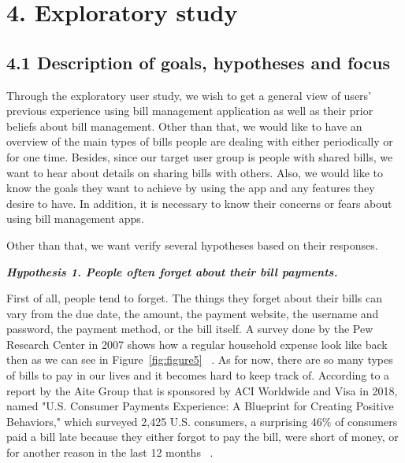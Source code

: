 \documentclass{sigchi}
\begin{document}
\section{4. Exploratory study}
\subsection{4.1 Description of goals, hypotheses and focus}

Through the exploratory user study, we wish to get a general view of users' previous experience using bill management application as well as their prior beliefs about bill management. Other than that, we would like to have an overview of the main types of bills people are dealing with either periodically or for one time. Besides, since our target user group is people with shared bills, we want to hear about details on sharing bills with others. Also, we would like to know the goals they want to achieve by using the app and any features they desire to have. In addition, it is necessary to know their concerns or fears about using bill management apps. 

Other than that, we want verify several hypotheses based on their responses.

\textbf{\textit{Hypothesis 1. People often forget about their bill payments.}}

First of all, people tend to forget. The things they forget about their bills can vary from the due date, the amount, the payment website, the username and password, the payment method, or the bill itself. A survey done by the Pew Research Center in 2007 shows how a regular household expense look like back then as we can see in Figure~\ref{fig:figure5} ~\cite{AWAPF}. As for now, there are so many types of bills to pay in our lives and it becomes hard to keep track of. According to a report by the Aite Group that is sponsored by ACI Worldwide and Visa in 2018, named "U.S. Consumer Payments Experience: A Blueprint for Creating Positive Behaviors," which surveyed 2,425 U.S. consumers, a surprising 46\% of consumers paid a bill late because they either forgot to pay the bill, were short of money, or for another reason in the last 12 months ~\cite{BAABs}.
\end{document}
